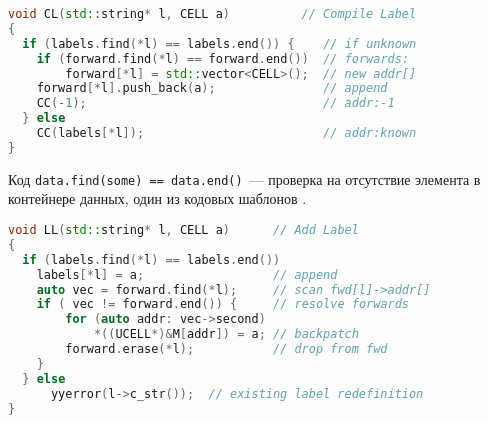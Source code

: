 \clearpage
\begin{lstlisting}[language=C++,title=asm.cpp]
void CL(std::string* l, CELL a)          // Compile Label
{
  if (labels.find(*l) == labels.end()) {    // if unknown
    if (forward.find(*l) == forward.end())  // forwards:
        forward[*l] = std::vector<CELL>();  // new addr[]
    forward[*l].push_back(a);               // append
    CC(-1);                                 // addr:-1
  } else 
    CC(labels[*l]);                         // addr:known
}
\end{lstlisting}
Код \verb|data.find(some) == data.end()|\ --- проверка на отсутствие элемента в
контейнере данных, один из кодовых шаблонов \cpp.
\clearpage
\begin{lstlisting}[language=C++,title=asm.cpp]
void LL(std::string* l, CELL a)      // Add Label
{
  if (labels.find(*l) == labels.end())
    labels[*l] = a;                  // append
    auto vec = forward.find(*l);     // scan fwd[l]->addr[]
    if ( vec != forward.end()) {     // resolve forwards
        for (auto addr: vec->second)
            *((UCELL*)&M[addr]) = a; // backpatch
        forward.erase(*l);           // drop from fwd
    }
  } else
      yyerror(l->c_str());  // existing label redefinition
}
\end{lstlisting}

